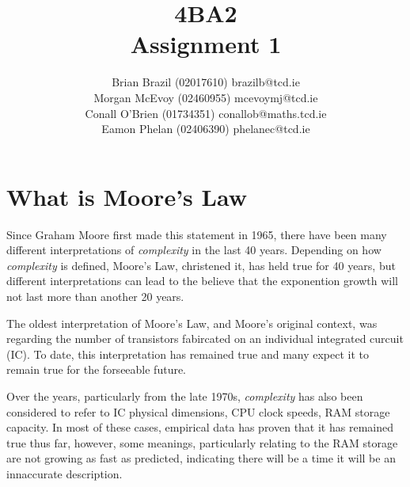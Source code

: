 \documentclass[a4paper,12pt]{article}
\begin{document}


\title{4BA2 \\ Assignment 1}

\author{Brian Brazil (02017610) brazilb@tcd.ie \\  Morgan McEvoy
(02460955) mcevoymj@tcd.ie \\ Conall O'Brien (01734351)
conallob@maths.tcd.ie \\ Eamon Phelan (02406390) phelanec@tcd.ie}

\maketitle

\section{What is Moore's Law}

\cite[The complexity for minimum component costs has increased at a rate
of roughly a factor of two per year ... Certainly over the short term
this rate can be expected to continue, if not to increase. Over the
longer term, the rate of increase is a bit more uncertain, although
there is no reason to believe it will not remain nearly constant for at
least 10 years. That means by 1975, the number of components per
integrated circuit for minimum cost will be 65,000. I believe that such
a large circuit can be built on a single wafer.]{a0}


Since Graham Moore first made this statement in 1965, there have been
many different interpretations of \emph{complexity} in the last 40
years. Depending on how \emph{complexity} is defined, Moore's Law,
\cite[as Caltech professor Carver Mead]{a1} christened it, has held true
for 40 years, but different interpretations can lead to the believe that
the exponention growth will not last more than another 20 years.


The oldest interpretation of Moore's Law, and Moore's original context,
was regarding the number of transistors fabircated on an individual 
integrated curcuit (IC). To date, this interpretation has remained true 
and many expect it to remain true for the forseeable future.


Over the years, particularly from the late 1970s, \emph{complexity} has 
also been considered to refer to IC physical dimensions, CPU clock 
speeds, RAM storage capacity. In most of these cases, empirical data has
proven that it has remained true thus far, however, some meanings,
particularly relating to the RAM storage are not growing as fast as
predicted, indicating there will be a time it will be an innaccurate
description.
\end{document}
